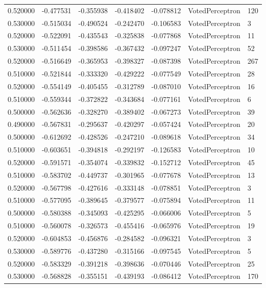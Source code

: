 \begin{tabular}{rrrrrll}
0.520000 & -0.477531 & -0.355938 & -0.418402 & -0.078812 & VotedPerceptron & 120 \\
0.530000 & -0.515034 & -0.490524 & -0.242470 & -0.106583 & VotedPerceptron & 3 \\
0.520000 & -0.522091 & -0.435543 & -0.325838 & -0.077868 & VotedPerceptron & 11 \\
0.530000 & -0.511454 & -0.398586 & -0.367432 & -0.097247 & VotedPerceptron & 52 \\
0.520000 & -0.516649 & -0.365953 & -0.398327 & -0.087398 & VotedPerceptron & 267 \\
0.510000 & -0.521844 & -0.333320 & -0.429222 & -0.077549 & VotedPerceptron & 28 \\
0.520000 & -0.554149 & -0.405455 & -0.312789 & -0.087010 & VotedPerceptron & 16 \\
0.510000 & -0.559344 & -0.372822 & -0.343684 & -0.077161 & VotedPerceptron & 6 \\
0.500000 & -0.562636 & -0.328270 & -0.389402 & -0.067273 & VotedPerceptron & 39 \\
0.490000 & -0.567831 & -0.295637 & -0.420297 & -0.057424 & VotedPerceptron & 20 \\
0.500000 & -0.612692 & -0.428526 & -0.247210 & -0.089618 & VotedPerceptron & 34 \\
0.510000 & -0.603651 & -0.394818 & -0.292197 & -0.126583 & VotedPerceptron & 10 \\
0.520000 & -0.591571 & -0.354074 & -0.339832 & -0.152712 & VotedPerceptron & 45 \\
0.510000 & -0.583702 & -0.449737 & -0.301965 & -0.077678 & VotedPerceptron & 13 \\
0.520000 & -0.567798 & -0.427616 & -0.333148 & -0.078851 & VotedPerceptron & 3 \\
0.510000 & -0.577095 & -0.389645 & -0.379577 & -0.075894 & VotedPerceptron & 11 \\
0.500000 & -0.580388 & -0.345093 & -0.425295 & -0.066006 & VotedPerceptron & 5 \\
0.510000 & -0.560078 & -0.326573 & -0.455416 & -0.065976 & VotedPerceptron & 19 \\
0.520000 & -0.604853 & -0.456876 & -0.284582 & -0.096321 & VotedPerceptron & 3 \\
0.530000 & -0.589776 & -0.437280 & -0.315166 & -0.097545 & VotedPerceptron & 5 \\
0.520000 & -0.583329 & -0.391218 & -0.398636 & -0.070446 & VotedPerceptron & 25 \\
0.530000 & -0.568828 & -0.355151 & -0.439193 & -0.086412 & VotedPerceptron & 170 \\

\end{tabular}
